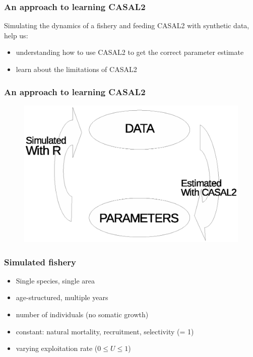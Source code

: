 \documentclass{beamer}
\begin{document}

\begin{frame}
\frametitle{An approach to learning CASAL2}
Simulating the dynamics of a fishery and feeding CASAL2 with synthetic data, help us:

\begin{itemize}
\item understanding how to use CASAL2 to get the correct parameter estimate
\item learn about the limitations of CASAL2
\end{itemize}

\end{frame}

\begin{frame}
\frametitle{An approach to learning CASAL2}

\begin{figure}
  \includegraphics[scale=0.8, angle=0]{diagram.eps}
  \end{figure}

\end{frame}


\begin{frame}
\frametitle{Simulated fishery}

\begin{itemize}
\item Single species, single area
\item age-structured, multiple years
\item number of individuals (no somatic growth)
\item constant: natural mortality, recruitment, selectivity (= 1)
\item varying exploitation rate ($0 \leq U \leq 1$)
\end{itemize}

\end{frame}
\end{document}
